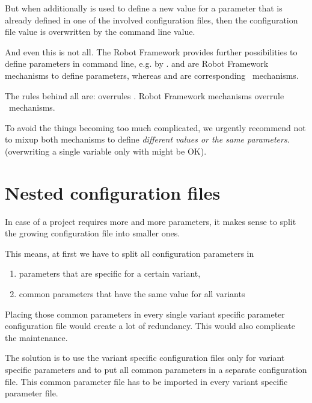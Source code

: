 But when additionally  is used to define a new value for a parameter that is already defined in one of the involved configuration files,
then the configuration file value is overwritten by the command line value.

\vspace{2ex}

And even this is not all. The Robot Framework provides further possibilities to define parameters in command line, e.g. by
.  and  are Robot Framework mechanisms to define parameters, whereas
 and  are corresponding \pkg\ mechanisms.

The rules behind all are:  overrules . Robot Framework mechanisms overrule \pkg\ mechanisms.

To avoid the things becoming too much complicated, we urgently recommend not to mixup both mechanisms to define \textit{different values or the same parameters}.
(overwriting a single variable only with  might be OK).


\newpage

\section{Nested configuration files}

In case of a project requires more and more parameters, it makes sense to split the growing configuration file into smaller ones.

This means, at first we have to split all configuration parameters in
\begin{enumerate}
   \item parameters that are specific for a certain variant,
   \item common parameters that have the same value for all variants
\end{enumerate}

Placing those common parameters in every single variant specific parameter configuration file would create a lot of redundancy.
This would also complicate the maintenance.

The solution is to use the variant specific configuration files only for variant specific parameters and to put all common parameters in
a separate configuration file. This common parameter file has to be imported in every variant specific parameter file.

